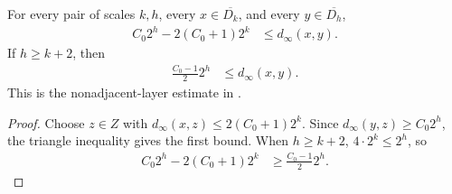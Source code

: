 \begin{lemma}
    \label{thm:area_law_dyadic_nonadjacent}
    \leanok
    For every pair of scales $k,h$, every $x\in\overline{D_k}$, and every
    $y\in\overline{D_h}$,
    \begin{align}
        C_0 2^h-2(C_0+1)2^k & \le d_\infty(x,y).
    \end{align}
    If $h\ge k+2$, then
    \begin{align}
        \frac{C_0-1}{2}2^h & \le d_\infty(x,y).
    \end{align}
    This is the nonadjacent-layer estimate in
    \cite[Section~11]{OpenAI2026AreaLaw}.
\end{lemma}
\begin{proof}\leanok
    Choose $z\in Z$ with $d_\infty(x,z)\le2(C_0+1)2^k$. Since
    $d_\infty(y,z)\ge C_0 2^h$, the triangle inequality gives the first bound.
    When $h\ge k+2$, $4\cdot2^k\le2^h$, so
    \begin{align}
        C_0 2^h-2(C_0+1)2^k & \ge \frac{C_0-1}{2}2^h.
    \end{align}
\end{proof}
